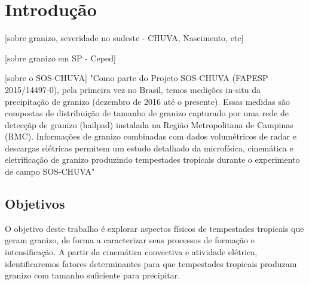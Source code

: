 \chapter{Introdução}

[sobre granizo, severidade no sudeste - CHUVA, Nascimento, etc]

[sobre granizo em SP - Ceped]

[sobre o SOS-CHUVA]
"Como parte do Projeto SOS-CHUVA (FAPESP 2015/14497-0), pela primeira vez no
Brasil, temos medições in-situ da precipitação de granizo (dezembro de 2016 até o presente). Essas
medidas são compostas de distribuição de tamanho de granizo capturado por uma rede de detecçãp
de granizo (hailpad) instalada na Região Metropolitana de Campinas (RMC). Informações de
granizo combinadas com dados volumétricos de radar e descargas elétricas permitem um estudo
detalhado da microfísica, cinemática e eletrificação de granizo produzindo tempestades tropicais
durante o experimento de campo SOS-CHUVA"


\section{Objetivos}

O objetivo deste trabalho é explorar aspectos físicos de tempestades tropicais que geram granizo, de forma a caracterizar seus processos de formação e intensificação. A partir da cinemática convectiva e atividade elétrica, identificaremos fatores determinantes para que tempestades tropicais produzam granizo com tamanho suficiente para precipitar.